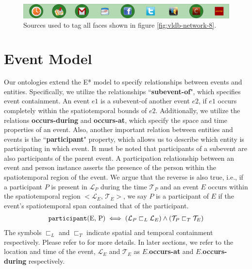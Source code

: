 \begin{figure}[h!]
\centering
\includegraphics[width=\textwidth]{media/chapter4/stacktrace/vldb-source-3.png}
\caption{Sources used to tag all faces shown in figure \ref{fig:vldb-network-8}.}
\label{fig:vldb-network-3}
\end{figure}


\section{Event Model}
Our ontologies extend the E* model\cite{gupta2011managing} to specify relationships between events and entities. Specifically, we utilize the relationships ``\textbf{subevent-of}", which specifies event containment. An event $e1$ is a subevent-of another event $e2$, if $e1$ occurs completely within the spatiotemporal bounds of $e2$. Additionally, we utilize the relations \textbf{occurs-during} and \textbf{occurs-at}, which specify the space and time properties of an event. Also, another important relation between entities and events is the ``\textbf{participant}" property, which allows us to describe which entity is participating in which event. It must be noted that participants of a subevent are also participants of the parent event. A participation relationship between an event and person instance asserts the presence of the person within the spatiotemporal region of the event. We argue that the reverse is also true, i.e., if a participant $P$ is present in $\mathcal{L}_P$ during the time $\mathcal{T}_P$ and an event $E$ occurs within the spatiotemporal region $<\mathcal{L}_E$, $\mathcal{T}_E>$, we say $P$ is a participant of $E$ if the event's spatiotemporal span contained that of the participant.
\begin{equation}
\label{eq:participation-region}
\begin{aligned}
\text{\texttt{participant}(E, P)} \iff (\mathcal{L}_P \sqsubset_L \mathcal{L}_E) \wedge (\mathcal{T}_P \sqsubset_T \mathcal{T}_E)
\end{aligned}
\end{equation}
The symbols $\sqsubset_L$ and $\sqsubset_T$ indicate spatial and temporal containment respectively. Please refer to \cite{gupta2011managing} for more details. In later sections, we refer to the location and time of the event, $\mathcal{L}_E$ and $\mathcal{T}_E$ as $E$.\textbf{occurs-at} and $E.$\textbf{occurs-during} respectively. 

